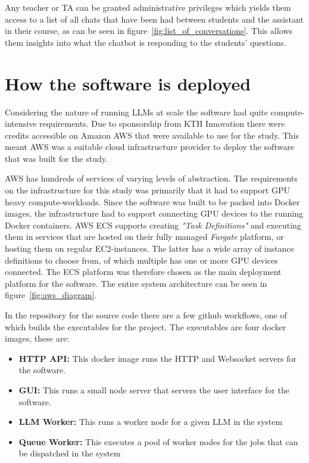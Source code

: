 Any teacher or TA can be granted administrative privileges which yields them access to a list of all chats that have been had between students and the assistant in their course, as can be seen in figure~\ref{fig:list_of_conversations}. This allows them insights into what the chatbot is responding to the students' questions.








\section{How the software is deployed}


Considering the nature of running \gls{LLM}s at scale the software had quite compute-intensive requirements. Due to sponsorship from KTH Innovation there were credits accessible on Amazon AWS that were available to use for the study. This meant AWS was a suitable cloud infrastructure provider to deploy the software that was built for the study.


AWS has hundreds of services of varying levels of abstraction. The requirements on the infrastructure for this study was primarily that it had to support GPU heavy compute-workloads. Since the software was built to be packed into Docker images, the infrastructure had to support connecting GPU devices to the running Docker containers. AWS \gls{ECS} supports creating \textit{"Task Definitions"} and executing them in services that are hosted on their fully managed \textit{Fargate} platform, or hosting them on regular \gls{EC2}-instances. The latter has a wide array of instance definitions to choose from, of which multiple has one or more GPU devices connected. The \gls{ECS} platform was therefore chosen as the main deployment platform for the software. The entire system architecture can be seen in figure~\ref{fig:aws_diagram}.





In the repository for the source code there are a few github workflows, one of which builds the executables for the project. The executables are four docker images, these are:


\begin{itemize}
        \item \textbf{HTTP API:} This docker image runs the HTTP and Websocket servers for the software.
        \item \textbf{GUI:} This runs a small node server that servers the user interface for the software.
        \item \textbf{LLM Worker:} This runs a worker node for a given \gls{LLM} in the system
        \item \textbf{Queue Worker:} This executes a pool of worker nodes for the jobs that can be dispatched in the system
\end{itemize}


